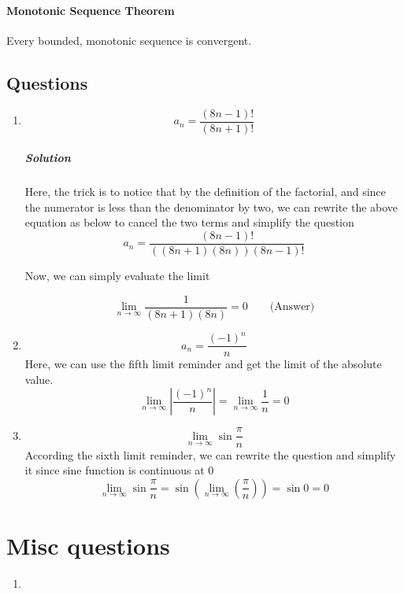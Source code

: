 \documentclass{article}
\begin{document}
\paragraph{Monotonic Sequence Theorem}
Every bounded, monotonic sequence is convergent.

\subsection{Questions}

\begin{enumerate}[1.]
\item
\[
	a_n = \frac{ (8n-1)! }{ (8n+1)! } 
\]

\subparagraph{Solution}
Here, the trick is to notice that by the definition of the factorial, and since the numerator is less than the denominator by two, we can rewrite the above equation as below to cancel the two terms and simplify the question
\[
	a_n= \frac{ (8n-1)! }{ ((8n+1)(8n))(8n-1)!  } 
\]

Now, we can simply evaluate the limit

\[
	\lim_{n \to \infty} \frac{1}{(8n+1)(8n)} = 0 \qquad \text{(Answer)}
\]
\item \[
		a_n= \frac{ (-1)^n }{ n } 
\]
Here, we can use the fifth limit reminder and get the limit of the absolute value. 
\[
	\lim_{n \to \infty} \left|  \frac{ (-1)^n }{ n }   \right| = 
		\lim_{n \to \infty} \frac{1}{n} = 0
\]

\item $$\lim_{n \to \infty} \sin{ \frac{\pi}{n} } $$
	According the sixth limit reminder, we can rewrite the question and simplify it since sine function is continuous at 0 
		\[\lim_{n \to \infty} \sin{ \frac{\pi}{n} } = 
			\sin{ \left( \lim_{n \to \infty} (\frac{\pi}{n}) \right) } = \sin{ 0 } = 0
		\]
		
\end{enumerate}


\newpage

\section{Misc questions}

\begin{enumerate}[1.]
\item 
\end{enumerate}




\end{document}
